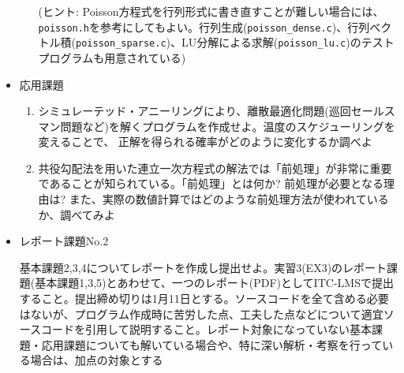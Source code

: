 \documentclass[11pt]{jarticle}
\begin{document}
\begin{itemize}
\begin{enumerate}
    (ヒント: Poisson方程式を行列形式に書き直すことが難しい場合には、{\tt poisson.h}を参考にしてもよい。行列生成({\tt poisson\_dense.c})、行列ベクトル積({\tt poisson\_sparse.c})、LU分解による求解({\tt poisson\_lu.c})のテストプログラムも用意されている)
  \end{enumerate}  
\item 応用課題
  \begin{enumerate}
  \item シミュレーテッド・アニーリングにより、離散最適化問題(巡回セールスマン問題など)を解くプログラムを作成せよ。温度のスケジューリングを変えることで、
正解を得られる確率がどのように変化するか調べよ
  \item 共役勾配法を用いた連立一次方程式の解法では「前処理」が非常に重要
であることが知られている。「前処理」とは何か? 前処理が必要となる理由は? また、実際の数値計算ではどのような前処理方法が使われているか、調べてみよ
  \end{enumerate}

\item レポート課題No.2

基本課題2,3,4についてレポートを作成し提出せよ。実習3(EX3)のレポート課題(基本課題1,3,5)とあわせて、一つのレポート(PDF)としてITC-LMSで提出すること。提出締め切りは1月11日とする。ソースコードを全て含める必要はないが、プログラム作成時に苦労した点、工夫した点などについて適宜ソースコードを引用して説明すること。レポート対象になっていない基本課題・応用課題についても解いている場合や、特に深い解析・考察を行っている場合は、加点の対象とする
\end{itemize}
\end{document}
